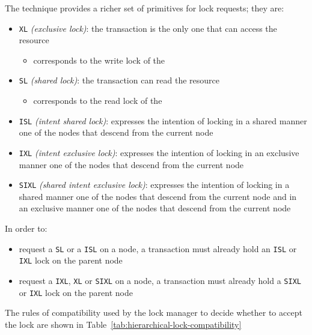 \documentclass[english]{article}
\begin{document}
\bigskip
The technique provides a richer set of primitives for lock requests; they are:

\begin{itemize}
  \item \texttt{XL} \textit{(exclusive lock)}: the transaction is the only one that can access the resource
        \begin{itemize}[label=\(\rightarrow\)]
          \item corresponds to the write lock of the \TPL
        \end{itemize}
  \item \texttt{SL} \textit{(shared lock)}: the transaction can read the resource
        \begin{itemize}[label=\(\rightarrow\)]
          \item corresponds to the read lock of the \TPL
        \end{itemize}
  \item \texttt{ISL} \textit{(intent shared lock)}: expresses the intention of locking in a shared manner one of the nodes that descend from the current node
  \item \texttt{IXL} \textit{(intent exclusive lock)}: expresses the intention of locking in an exclusive manner one of the nodes that descend from the current node
  \item \texttt{SIXL} \textit{(shared intent exclusive lock)}: expresses the intention of locking in a shared manner one of the nodes that descend from the current node and in an exclusive manner one of the nodes that descend from the current node
\end{itemize}

In order to:

\begin{itemize}
  \item request a \texttt{SL} or a \texttt{ISL} on a node, a transaction must already hold an \texttt{ISL} or \texttt{IXL} lock on the parent node
  \item request a \texttt{IXL}, \texttt{XL} or \texttt{SIXL} on a node, a transaction must already hold a \texttt{SIXL} or \texttt{IXL} lock on the parent node
\end{itemize}

\bigskip
The rules of compatibility used by the lock manager to decide whether to accept the lock are shown in Table~\ref{tab:hierarchical-lock-compatibility}
\end{document}
